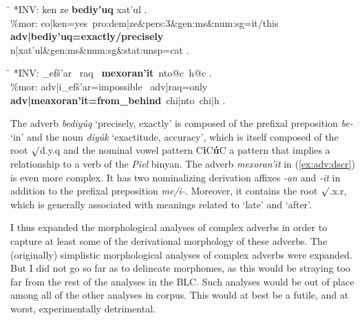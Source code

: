 \begin{exe}
\ex \label{ex:adv:bediyuq}
	\begin{tabbing}
	\hspace{0.6in} \= \hspace{5.5in} \kill
	\textsf{*INV:} \> \textsf{ken ze \textbf{bediy\a'{u}q} xat\a'{u}l .} \\
	\textsf{\%mor:} \> \textsf{co|ken=yes\, pro:dem|ze\&pers:3\&gen:ms\&num:sg=it/this} \\
				\> \textsf{\textbf{adv|bediy\a'{u}q=exactly/precisely}} \\
				\> \textsf{n|xat\a'{u}l\&gen:ms\&num:sg\&stat:unsp=cat .}
	\end{tabbing}
\ex \label{ex:adv:dscr}
	\begin{tabbing}
	\hspace{0.6in} \= \hspace{5.5in} \kill
	\textsf{*INV:} \> \textsf{\_{\textglotstop}{e}f\v{s}\a'{a}r \, raq \, \textbf{mexoran\a'{i}t}\, 
		nto@c\, h@c .} \\
	\textsf{\%mor:} \> \textsf{adv|{\textglotstop}i\_{\textglotstop}ef\v{s}\a'{a}r=impossible \, adv|raq=only}\\
	 \> \textsf{\textbf{adv|me{\textglotstop}axoran\a'{i}t=from\_behind}\, chi|nto\, chi|h .}
	\end{tabbing}
\end{exe}

The adverb \textit{bediy\'uq} `precisely, exactly'
is composed of the prefixal preposition \textit{be-} `in' and the 
noun \textit{diy\'uk} `exactitude, accuracy', which is itself composed of the 
root $\surd$d.y.q and the nominal vowel pattern C\textbf{i}C\textbf{\'u}C 
a pattern that implies a relationship to a verb of the \textit{Piel} binyan.  
The adverb \textit{\textsf{mexoran\a'{i}t}} in 
(\ref{ex:adv:dscr}) is even more complex. It has two nominalizing
derivation affixes \textit{\textsf{-an}} and \textit{\textsf{-it}} in addition 
to the prefixal preposition \textit{\textsf{me/i-}}. Moreover, it contains the 
root $\surd$\textsf{.x.r}, which is generally associated with meanings 
related to `late' and `after'.

I thus expanded the morphological analyses of complex adverbs in order to capture at 
least some of the derivational morphology of these adverbs.
The (originally) simplistic morphological analyses of complex adverbs were expanded.
But I did not go so far as to delineate morphomes, as this would 
be straying too far from the rest of the analyses in the \ac{BLC}. Such 
analyses would be out of place among all of the other analyses in corpus. 
This would at best be a futile, and at worst, experimentally detrimental.

